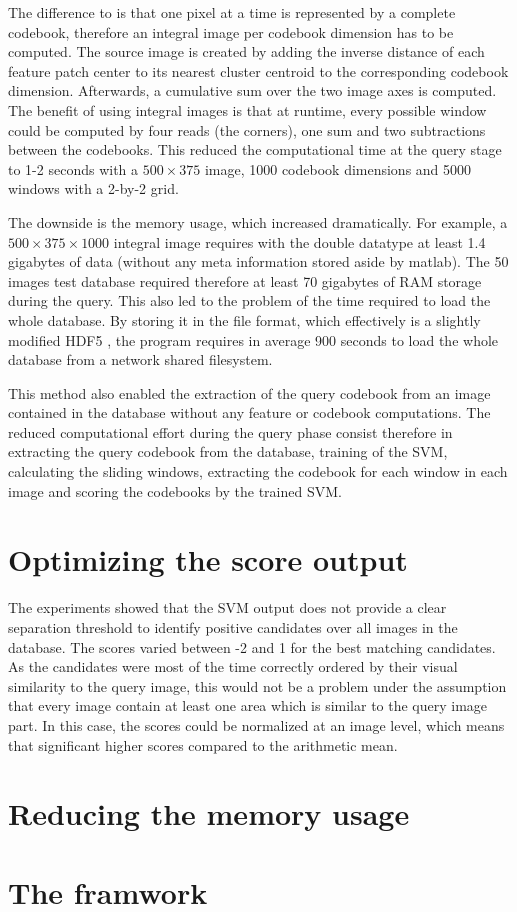 The difference to \cite{viola2001rapid} is that one pixel at a time is represented by a complete codebook, therefore an integral image per codebook dimension has to be computed. The source image is created by adding the inverse distance of each feature patch center to its nearest cluster centroid to the corresponding codebook dimension. Afterwards, a cumulative sum over the two image axes is computed. The benefit of using integral images is that at runtime, every possible window could be computed by four reads (the corners), one sum and two subtractions between the codebooks. This reduced the computational time at the query stage to 1-2 seconds with a $500\times375$ image, 1000 codebook dimensions and 5000 windows with a 2-by-2 grid.

The downside is the memory usage, which increased dramatically. For example, a $500 \times 375 \times 1000$ integral image requires with the double datatype at least 1.4 gigabytes of data (without any meta information stored aside by matlab). The 50 images test database required therefore at least 70 gigabytes of RAM storage during the query. This also led to the problem of the time required to load the whole database. By storing it in the  file format, which effectively is a slightly modified HDF5 \cite{hdf5}, the program requires in average 900 seconds to load the whole database from a network shared filesystem.

This method also enabled the extraction of the query codebook from an image contained in the database without any feature or codebook computations. The reduced computational effort during the query phase consist therefore in extracting the query codebook from the database, training of the \ac{SVM}, calculating the sliding windows, extracting the codebook for each window in each image and scoring the codebooks by the trained \ac{SVM}.

\section{Optimizing the score output}


The experiments showed that the \ac{SVM} output does not provide a clear separation threshold to identify positive candidates over all images in the database. The scores varied between -2 and 1 for the best matching candidates. As the candidates were most of the time correctly ordered by their visual similarity to the query image, this would not be a problem under the assumption that every image contain at least one area which is similar to the query image part. In this case, the scores could be normalized at an image level, which means that significant higher scores compared to the arithmetic mean. %

\section{Reducing the memory usage}


\section{The framwork}
